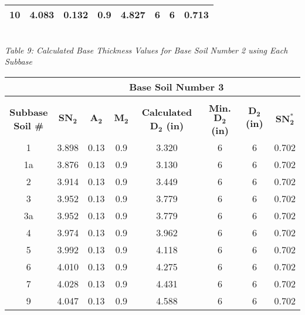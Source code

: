 \documentclass{article}
\begin{document}
\begin{center}
\begin{spacing}{1.6}
\begin{tabular}{|c|ccccccc|}
                                            10 & 4.083 & 0.132 & 0.9 & 4.827 & 6 & 6 & 0.713 \\\hline
        \end{tabular}
        \vspace{3mm}
        \emph{\\Table 9: Calculated Base Thickness Values for Base Soil Number 2 using Each Subbase\\}
        \vspace{7mm}
        \begin{tabular}{|c|ccccccc|}
            \hline    
            \multicolumn{1}{|l}{}                     & \multicolumn{7}{c|}{\textbf{Base Soil Number 3}}                                              \\\hline
            &&&&&&&\\
             \shortstack[c]{\textbf{Subbase}\\\textbf{Soil \#}} & $\bm{SN_2}$ & $\bm{A_2}$ & $\bm{M_2}$ & \textbf{Calculated $\bm{D_2}$ (in)} & \textbf{Min. $\bm{D_2}$ (in)} & \textbf{$\bm{D_2}$ (in)} & $\bm{SN_2^*}$  \\\hline
                                            1  & 3.898 & 0.13 & 0.9 & 3.320 & 6 & 6 & 0.702  \\
                                            1a & 3.876 & 0.13 & 0.9 & 3.130 & 6 & 6 & 0.702  \\
                                            2  & 3.914 & 0.13 & 0.9 & 3.449 & 6 & 6 & 0.702  \\
                                            3  & 3.952 & 0.13 & 0.9 & 3.779 & 6 & 6 & 0.702  \\
                                            3a & 3.952 & 0.13 & 0.9 & 3.779 & 6 & 6 & 0.702  \\
                                            4  & 3.974 & 0.13 & 0.9 & 3.962 & 6 & 6 & 0.702  \\
                                            5  & 3.992 & 0.13 & 0.9 & 4.118 & 6 & 6 & 0.702  \\
                                            6  & 4.010 & 0.13 & 0.9 & 4.275 & 6 & 6 & 0.702  \\
                                            7  & 4.028 & 0.13 & 0.9 & 4.431 & 6 & 6 & 0.702  \\
                                            9  & 4.047 & 0.13 & 0.9 & 4.588 & 6 & 6 & 0.702  \\

\end{tabular}
\end{spacing}
\end{center}
\end{document}
